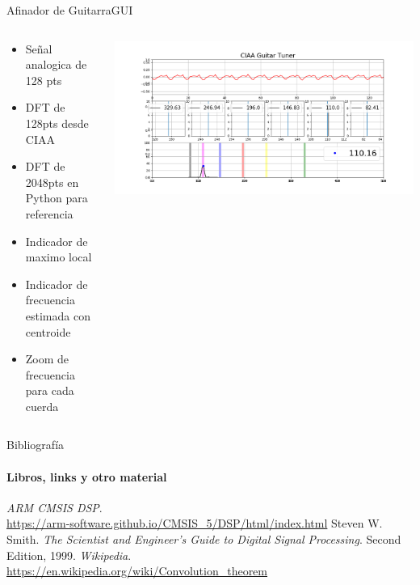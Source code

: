 \begin{frame}[t]{Afinador de Guitarra}{GUI}
   \footnotesize
   \begin{columns}
      \begin{column}{.3\textwidth}
         \begin{itemize}
            \item{Señal analogica de 128 pts}
            \item{DFT de 128pts desde CIAA}
            \item{DFT de 2048pts en Python para referencia}
            \item{Indicador de maximo local}
            \item{Indicador de frecuencia estimada con centroide}
            \item{Zoom de frecuencia para cada cuerda}
         \end{itemize}
      \end{column}
      \begin{column}{.7\textwidth}
       \href{run:./1_clase/tuner.mp4}{
         \includegraphics[width=1.0\textwidth]{7_clase/tuner1}
       }
      \end{column}
   \end{columns}
   \vfill
   \note{
      \begin{itemize}
         \item{}
         \item{}
      \end{itemize}
   }
\end{frame}
\begin{frame}{Bibliografía}
   \framesubtitle{Libros, links y otro material}
   \begin{thebibliography}{9}
         \emph{ARM CMSIS DSP}. \\
         \href {https://arm-software.github.io/CMSIS_5/DSP/html/index.html}{https://arm-software.github.io/CMSIS\_5/DSP/html/index.html}
         Steven W. Smith.
         \emph{The Scientist and Engineer's Guide to Digital Signal Processing}.
         Second Edition, 1999.
         \emph{Wikipedia}. \\
         \href {https://en.wikipedia.org/wiki/Convolution\_theorem}{https://en.wikipedia.org/wiki/Convolution\_theorem}
   \end{thebibliography}
\end{frame}
